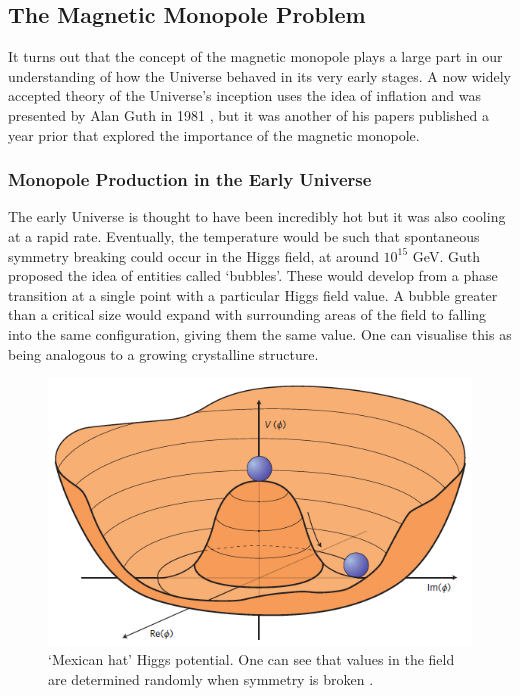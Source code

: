 \documentclass[fleqn, twocolumn, 10pt]{article}
\begin{document}

\subsection{The Magnetic Monopole Problem}

It turns out that the concept of the magnetic monopole plays a large part in our understanding of how the Universe behaved in its very early stages. A now widely accepted theory of the Universe’s inception uses the idea of inflation and was presented by Alan Guth in 1981 \cite{preskill1984magnetic, liddle2015cosmo, guth1981inflate, Ian2002Lawrie}, but it was another of his papers published a year prior that explored the importance of the magnetic monopole.

\subsubsection{Monopole Production in the Early Universe}

The early Universe is thought to have been incredibly hot but it was also cooling at a rapid rate. Eventually, the temperature would be such that spontaneous symmetry breaking could occur in the Higgs field, at around $10^{15}$ GeV. Guth proposed the idea of entities called `bubbles'. These would develop from a phase transition at a single point with a particular Higgs field value. A bubble greater than a critical size would expand with surrounding areas of the field to falling into the same configuration, giving them the same value. One can visualise this as being analogous to a growing crystalline structure.
\begin{figure}[h!]
\includegraphics[width=\linewidth]{higgspotential.png}
\caption{`Mexican hat' Higgs potential. One can see that values in the field are determined randomly when symmetry is broken \cite{Ellis_2016}.}
\end{figure}
\end{document}
